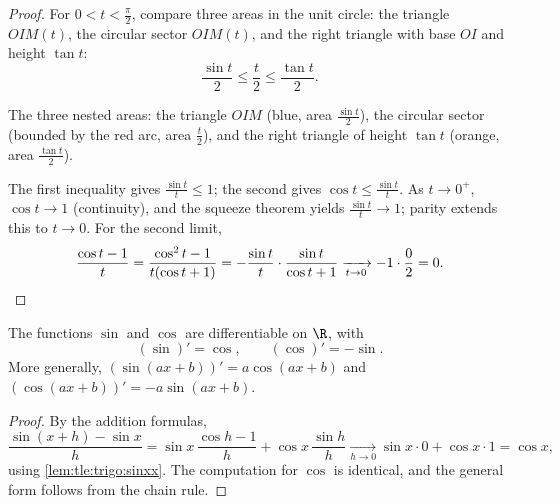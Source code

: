 \begin{proof}
For $0 < t < \frac{\pi}{2}$, compare three areas in the unit circle: the
triangle $OIM(t)$, the circular sector $OIM(t)$, and the right triangle with
base $OI$ and height $\tan t$:
\[
\frac{\sin t}{2} \leq \frac{t}{2} \leq \frac{\tan t}{2}.
\]

\begin{omfigure}

{\small The three nested areas: the triangle $OIM$ (blue, area
$\frac{\sin t}{2}$), the circular sector (bounded by the red arc, area
$\frac{t}{2}$), and the right triangle of height $\tan t$ (orange, area
$\frac{\tan t}{2}$).}
\end{omfigure}

The first inequality gives $\frac{\sin t}{t} \leq 1$; the second gives
$\cos t \leq \frac{\sin t}{t}$. As $t \to 0^+$, $\cos t \to 1$ (continuity),
and the squeeze theorem yields $\frac{\sin t}{t} \to 1$; parity extends this
to $t \to 0$. For the second limit,
\[
\frac{\cos t - 1}{t} = \frac{\cos^2 t - 1}{t(\cos t + 1)}
= -\frac{\sin t}{t}\cdot\frac{\sin t}{\cos t + 1}
\xrightarrow[t\to0]{} -1 \cdot \frac{0}{2} = 0. \qedhere
\]
\end{proof}

\begin{theorem}\label{thm:tle:trigo:derivatives}
The functions $\sin$ and $\cos$ are differentiable on $\R$, with
\[
(\sin)' = \cos, \qquad (\cos)' = -\sin .
\]
More generally, $(\sin(ax+b))' = a\cos(ax+b)$ and
$(\cos(ax+b))' = -a\sin(ax+b)$.
\end{theorem}

\begin{proof}
By the addition formulas,
\[
\frac{\sin(x+h) - \sin x}{h}
= \sin x\,\frac{\cos h - 1}{h} + \cos x\,\frac{\sin h}{h}
\xrightarrow[h\to0]{} \sin x \cdot 0 + \cos x \cdot 1 = \cos x,
\]
using \cref{lem:tle:trigo:sinxx}. The computation for $\cos$ is identical,
and the general form follows from the chain rule.
\end{proof}

